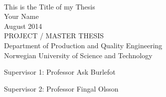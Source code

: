 
\thispagestyle{empty}
\mbox{}\\[6pc]
\begin{center}
\Huge{This is the Title of my Thesis}\\[2pc]

\Large{Your Name}\\[1pc]
\large{August 2014}\\[2pc]

PROJECT / MASTER THESIS\\
Department of Production and Quality Engineering\\
Norwegian University of Science and Technology
\end{center}
\vfill

\noindent Supervisor 1: Professor Ask Burlefot

\noindent Supervisor 2: Professor Fingal Olsson

